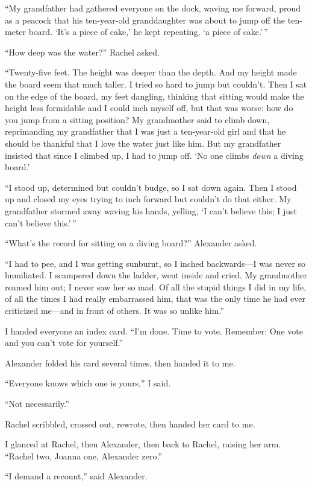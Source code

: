 ``My grandfather had gathered everyone on the dock, waving me forward,
proud as a peacock that his ten-year-old granddaughter was about to jump
off the ten-meter board. `It's a piece of cake,' he kept repeating, `a
piece of cake.'\,''

``How deep was the water?'' Rachel asked.

``Twenty-five feet. The height was deeper than the depth. And my height
made the board seem that much taller. I tried so hard to jump but
couldn't. Then I sat on the edge of the board, my feet dangling,
thinking that sitting would make the height less formidable and I could
inch myself off, but that was worse: how do you jump from a sitting
position? My grandmother said to climb down, reprimanding my grandfather
that I was just a ten-year-old girl and that he should be thankful that
I love the water just like him. But my grandfather insisted that since I
climbed up, I had to jump off. `No one climbs \emph{down} a diving
board.'

``I stood up, determined but couldn't budge, so I sat down again. Then I
stood up and closed my eyes trying to inch forward but couldn't do that
either. My grandfather stormed away waving his hands, yelling, `I can't
believe this; I just can't believe this.'\,''

``What's the record for sitting on a diving board?'' Alexander asked.

``I had to pee, and I was getting sunburnt, so I inched backwards---I
was never so humiliated. I scampered down the ladder, went inside and
cried. My grandmother reamed him out; I never saw her so mad. Of all the
stupid things I did in my life, of all the times I had really
embarrassed him, that was the only time he had ever criticized me---and
in front of others. It was so unlike him.''

I handed everyone an index card. ``I'm done. Time to vote. Remember: One
vote and you can't vote for yourself.''

Alexander folded his card several times, then handed it to me.

``Everyone knows which one is yours,'' I said.

``Not necessarily.''

Rachel scribbled, crossed out, rewrote, then handed her card to me.

I glanced at Rachel, then Alexander, then back to Rachel, raising her
arm. ``Rachel two, Joanna one, Alexander zero.''

``I demand a recount,'' said Alexander.

